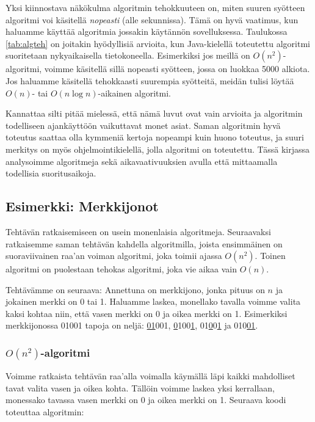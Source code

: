 Yksi kiinnostava näkökulma algoritmin tehokkuuteen on,
miten suuren syötteen algoritmi voi käsitellä \emph{nopeasti}
(alle sekunnissa).
Tämä on hyvä vaatimus, kun haluamme käyttää algoritmia
jossakin käytännön sovelluksessa.
Taulukossa \ref{tab:algteh} on joitakin hyödyllisiä arvioita,
kun Java-kielellä toteutettu
algoritmi suoritetaan nykyaikaisella tietokoneella.
Esimerkiksi jos meillä on $O(n^2)$-algoritmi, voimme käsitellä sillä
nopeasti syötteen, jossa on luokkaa 5000 alkiota.
Jos haluamme käsitellä tehokkaasti suurempia syötteitä,
meidän tulisi löytää $O(n)$- tai $O(n \log n)$-aikainen algoritmi.

Kannattaa silti pitää mielessä, että nämä luvut ovat vain arvioita ja algoritmin
todelliseen ajankäyttöön vaikuttavat monet asiat.
Saman algoritmin hyvä toteutus saattaa olla
kymmeniä kertoja nopeampi kuin huono toteutus,
ja suuri merkitys on myös ohjelmointikielellä,
jolla algoritmi on toteutettu.
Tässä kirjassa analysoimme algoritmeja sekä aikavaativuuksien
avulla että mittaamalla todellisia suoritusaikoja.

\subsection{Esimerkki: Merkkijonot}

Tehtävän ratkaisemiseen on usein monenlaisia algoritmeja.
Seuraavaksi ratkaisemme saman tehtävän kahdella algoritmilla,
joista ensimmäinen on suoraviivainen raa'an voiman
algoritmi, joka toimii ajassa $O(n^2)$.
Toinen algoritmi on puolestaan tehokas algoritmi,
joka vie aikaa vain $O(n)$.

Tehtävämme on seuraava: Annettuna on merkkijono,
jonka pituus on $n$ ja jokainen merkki on 0 tai 1.
Haluamme laskea, monellako tavalla voimme valita kaksi kohtaa
niin, että vasen merkki on 0 ja oikea merkki on 1.
Esimerkiksi merkkijonossa 01001 tapoja on neljä:
\underline{01}001, \underline{0}100\underline{1},
01\underline{0}0\underline{1} ja 010\underline{01}.

\subsubsection{$O(n^2)$-algoritmi}

Voimme ratkaista tehtävän raa'alla voimalla
käymällä läpi kaikki mahdolliset tavat valita vasen ja oikea kohta.
Tällöin voimme laskea yksi kerrallaan,
monessako tavassa vasen merkki on 0 ja oikea merkki on 1.
Seuraava koodi toteuttaa algoritmin:

